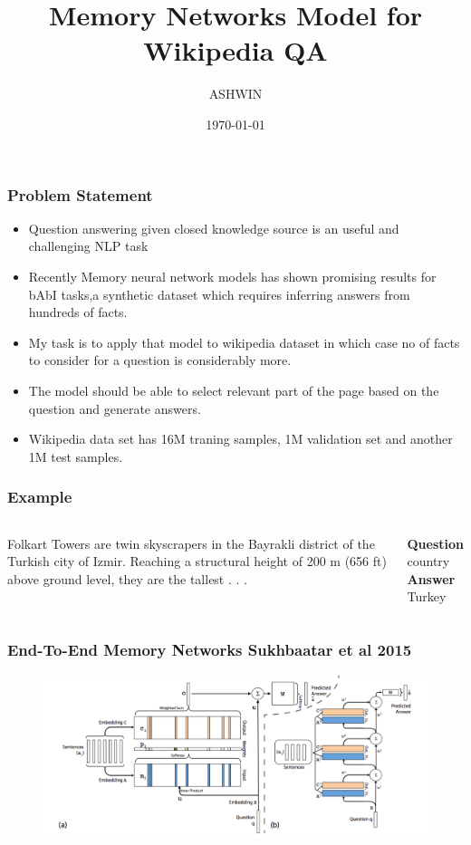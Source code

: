 \documentclass{beamer}
\title[Project]{Memory Networks Model for Wikipedia QA} %
\author{ASHWIN} %
\institute[CU] %
{
University of Colorado Boulder \\ %
\medskip
\textit{ashwin.asokan@colorado.edu} %
}
\date{\today} %
\begin{document}
\begin{frame}
\titlepage %
\end{frame}

\begin{frame}
\frametitle{Problem Statement}
\begin{itemize}
\item Question answering given closed knowledge source is an useful and challenging NLP task
\item Recently Memory neural network models has shown promising results for bAbI tasks,a  synthetic  dataset which requires inferring answers from  hundreds of facts.
\item My task is to apply that model to wikipedia dataset in which case no of facts to consider for a question is considerably more.
\item The model should be able to select relevant part of the page based on the question and generate answers.
\item Wikipedia data set has 16M traning samples, 1M validation set and another 1M test samples.
\end{itemize}
\end{frame}



\begin{frame}
\frametitle{Example}
\begin{columns}[c] %

Folkart Towers are twin  skyscrapers  in  the Bayrakli 
district  of  the Turkish   city   of   Izmir.
Reaching    a    structural height of 200 m (656 ft)
above ground level, they are the tallest . . .

\textbf{Question}
country\\
\textbf{Answer}
Turkey\\

\end{columns}
\end{frame}


\begin{frame}
\frametitle{End-To-End Memory Networks Sukhbaatar et al 2015 }
\begin{figure}
\includegraphics[width=0.8\linewidth]{model}
\end{figure}
\end{frame}
\end{document}

